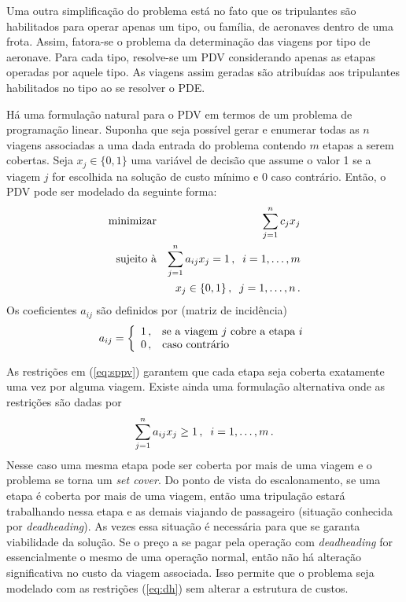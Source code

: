 Uma outra simplificação do problema está no fato que os tripulantes são habilitados para operar
apenas um tipo, ou família, de aeronaves dentro de uma frota. Assim, fatora-se o problema da
determinação das viagens por tipo de aeronave. Para cada tipo, resolve-se um PDV considerando apenas
as etapas operadas por aquele tipo. As viagens assim geradas são atribuídas aos tripulantes
habilitados no tipo ao se resolver o PDE.

Há uma formulação natural para o PDV em termos de um problema de programação linear. Suponha que
seja possível gerar e enumerar todas as $n$ viagens associadas a uma dada entrada do problema
contendo $m$ etapas a serem cobertas. Seja $x_j \in \{0, 1\}$ uma variável de decisão que assume o
valor 1 se a viagem $j$ for escolhida na solução de custo mínimo e 0 caso contrário. Então, o PDV
pode ser modelado da seguinte forma:
%
\begin{eqnarray} \label{eq:sppv}
	\text{minimizar} && \displaystyle \sum_{j=1}^n c_j x_j \nonumber \\
	\text{sujeito à} && \displaystyle \sum_{j=1}^n a_{ij} x_j = 1 \, , \;\; i = 1, \ldots, m \\
		               && x_j \in \{0, 1\} \, , \;\; j = 1, \ldots, n \, . \nonumber
\end{eqnarray} 
%
Os coeficientes $a_{ij}$ são definidos por (matriz de incidência)
%
\begin{equation*}
	a_{ij} = \left\{
	\begin{array}{ll}
			1 \, , & \text{se a viagem $j$ cobre a etapa $i$} \\
			0 \, , & \text{caso contrário}
	\end{array}
	\right.
\end{equation*}

As restrições em (\ref{eq:sppv}) garantem que cada etapa seja coberta exatamente uma vez por alguma
viagem. Existe ainda uma formulação alternativa onde as restrições são dadas por
%
\begin{equation} \label{eq:dh} 
	\sum_{j=1}^n a_{ij} x_j \geq 1 \, , \;\; i = 1, \ldots, m \, .
\end{equation} 
%
Nesse caso uma mesma etapa pode ser coberta por mais de uma viagem e o problema se torna um
\emph{set cover}. Do ponto de vista do escalonamento, se uma etapa é coberta por mais
de uma viagem, então uma tripulação estará trabalhando nessa etapa e as demais viajando de
passageiro (situação conhecida por \emph{deadheading}). As vezes essa situação é necessária para
que se garanta viabilidade da solução. Se o preço a se pagar pela operação com \emph{deadheading} 
for essencialmente o mesmo de uma operação normal, então não há alteração significativa no custo 
da viagem associada. Isso permite que o problema seja modelado com as restrições (\ref{eq:dh}) 
sem alterar a estrutura de custos.

